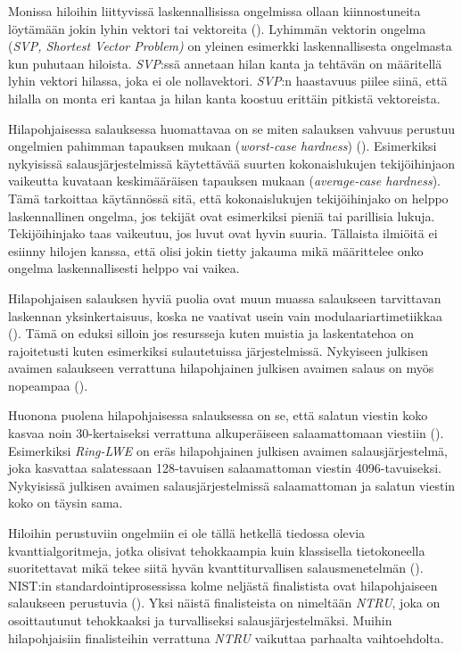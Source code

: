 Monissa hiloihin liittyvissä 
laskennallisissa ongelmissa ollaan kiinnostuneita löytämään jokin lyhin vektori tai vektoreita (\cite{regev2006lattice}). Lyhimmän vektorin ongelma (\emph{SVP, Shortest Vector Problem)} on yleinen esimerkki laskennallisesta ongelmasta kun puhutaan hiloista. \emph{SVP}:ssä annetaan hilan kanta ja tehtävän on määritellä lyhin vektori hilassa, joka ei ole nollavektori. \emph{SVP}:n haastavuus piilee siinä, että hilalla on monta eri kantaa ja hilan kanta koostuu erittäin pitkistä vektoreista.

Hilapohjaisessa salauksessa huomattavaa on se miten salauksen vahvuus perustuu ongelmien pahimman tapauksen mukaan (\emph{worst-case hardness}) (\cite{regev2006lattice}). Esimerkiksi nykyisissä salausjärjestelmissä käytettävää suurten kokonaislukujen tekijöihinjaon vaikeutta kuvataan keskimääräisen tapauksen mukaan (\emph{average-case hardness}). Tämä tarkoittaa käytännössä sitä, että kokonaislukujen tekijöihinjako on helppo laskennallinen ongelma, jos tekijät ovat esimerkiksi pieniä tai parillisia lukuja. Tekijöihinjako taas vaikeutuu, jos luvut ovat hyvin suuria. Tällaista ilmiöitä ei esiinny hilojen kanssa, että olisi jokin tietty jakauma mikä määrittelee onko ongelma laskennallisesti helppo vai vaikea.

Hilapohjaisen salauksen hyviä puolia ovat muun muassa salaukseen tarvittavan laskennan yksinkertaisuus, koska ne vaativat usein vain modulaariartimetiikkaa (\cite{regev2006lattice}). Tämä on eduksi silloin jos resursseja kuten muistia ja laskentatehoa on rajoitetusti kuten esimerkiksi sulautetuissa järjestelmissä. Nykyiseen julkisen avaimen salaukseen verrattuna hilapohjainen julkisen avaimen salaus on myös nopeampaa (\cite{8275352}).

Huonona puolena hilapohjaisessa salauksessa on se, että salatun viestin koko kasvaa noin 30-kertaiseksi verrattuna alkuperäiseen salaamattomaan viestiin (\cite{8275352}). Esimerkiksi \emph{Ring-LWE} on eräs hilapohjainen julkisen avaimen salausjärjestelmä, joka kasvattaa salatessaan 128-tavuisen salaamattoman viestin 4096-tavuiseksi. Nykyisissä julkisen avaimen salausjärjestelmissä salaamattoman ja salatun viestin koko on täysin sama.

Hiloihin perustuviin ongelmiin ei ole tällä hetkellä tiedossa olevia kvanttialgoritmeja, jotka olisivat tehokkaampia kuin klassisella tietokoneella suoritettavat mikä tekee siitä hyvän kvanttiturvallisen salausmenetelmän (\cite{regev2006lattice}). NIST:in standardointiprosessissa kolme neljästä finalistista ovat hilapohjaiseen salaukseen perustuvia (\cite{alagic2020status}). Yksi näistä finalisteista on nimeltään \emph{NTRU}, joka on osoittautunut tehokkaaksi ja turvalliseksi salausjärjestelmäksi. Muihin hilapohjaisiin finalisteihin verrattuna \emph{NTRU} vaikuttaa parhaalta vaihtoehdolta.

